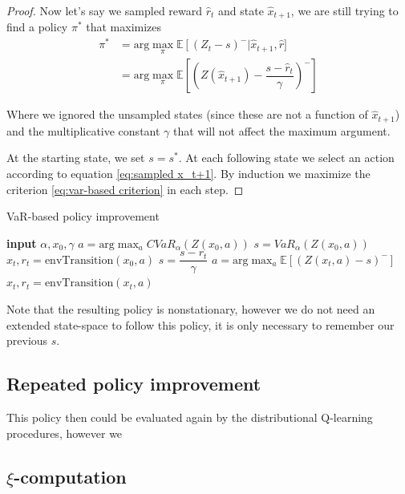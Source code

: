 \begin{proof}
Now let's say we sampled reward $\hat{r}_t$ and state $\hat{x}_{t+1}$, we are still trying to find a policy $\pi^*$ that maximizes 
\begin{equation}\label{eq:sampled x_t+1}
\begin{split}
\pi^* &=\text{arg}\max_\pi \mathbb{E}\left[(Z_t-s)^-\right | \hat{x}_{t+1}, \hat{r}]\\
&= \text{arg}\max_\pi \mathbb{E}\left[\left(Z(\hat{x}_{t+1}) - \dfrac{s - \hat{r}_t}{\gamma}\right)^-\right]
\end{split}
\end{equation}

Where we ignored the unsampled states (since these are not a function of $\hat{x}_{t+1}$) and the multiplicative constant $\gamma$ that will not affect the maximum argument.

At the starting state, we set $s=s^*$. At each following state we select an action according to equation \ref{eq:sampled x_t+1}. By induction we maximize the criterion \ref{eq:var-based criterion} in each step.
\end{proof}

\begin{algorithm}
\caption{VaR-based policy improvement}
\label{alg:var}
\begin{algorithmic}
    \STATE \textbf{input} $\alpha, x_0, \gamma$
    \STATE $a = \text{arg}\max_a CVaR_\alpha(Z(x_0, a))$
    \STATE $s = VaR_\alpha(Z(x_0, a))$
    \STATE $x_t, r_t = \text{envTransition}(x_0, a)$
    	\STATE $s = \dfrac{s-r_t}{\gamma}$
    	\STATE $a = \text{arg}\max_a \mathbb{E}\left[(Z(x_t, a)-s)^- \right]$
    	\STATE $x_t, r_t = \text{envTransition}(x_t, a)$
   	\ENDWHILE
\end{algorithmic}
\end{algorithm}

Note that the resulting policy is nonstationary, however we do not need an extended state-space to follow this policy, it is only necessary to remember our previous $s$.

\subsection{Repeated policy improvement}
This policy then could be evaluated again by the distributional Q-learning procedures, however we 


\subsection{$\xi$-computation}

